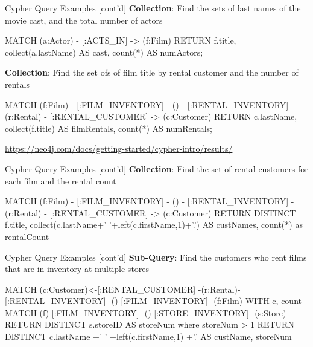 \documentclass[ignorenonframetext,xcolor=x11names]{beamer}
\begin{document}
\begin{frame}[fragile]{Cypher Query Examples \small [cont'd]}
\textbf{Collection}: Find the sets of last names of the movie cast, and the total number of actors
\footnotesize
\begin{cyphercode}
MATCH (a:Actor) - [:ACTS_IN] -> (f:Film) 
RETURN f.title, 
       collect(a.lastName) AS cast, 
       count(*) AS numActors;
\end{cyphercode}
\normalsize
\textbf{Collection}: Find the set ofs of film title by rental customer and the number of rentals
\footnotesize
\begin{cyphercode}
MATCH (f:Film) - [:FILM_INVENTORY] 
    - () - [:RENTAL_INVENTORY] 
    - (r:Rental) - [:RENTAL_CUSTOMER] 
    -> (c:Customer)
RETURN c.lastName, 
       collect(f.title) AS filmRentals, 
       count(*) AS numRentals;
\end{cyphercode}

\scriptsize
\url{https://neo4j.com/docs/getting-started/cypher-intro/results/}
\end{frame}


\begin{frame}[fragile]{Cypher Query Examples \small [cont'd]}
\textbf{Collection}: Find the set of rental customers for each film and the rental count
\footnotesize
\begin{cyphercode}
MATCH (f:Film) - [:FILM_INVENTORY] 
    - () - [:RENTAL_INVENTORY] 
    - (r:Rental) - [:RENTAL_CUSTOMER] 
    -> (c:Customer)
RETURN DISTINCT f.title, 
      collect(c.lastName+' '+left(c.firstName,1)+'.') 
          AS custNames, 
      count(*) as rentalCount
\end{cyphercode}
\end{frame}

\begin{frame}[fragile]{Cypher Query Examples \small [cont'd]}
\textbf{Sub-Query}: Find the customers who rent films that are in inventory at multiple stores
\footnotesize
\begin{cyphercode}
MATCH (c:Customer)<-[:RENTAL_CUSTOMER]
     -(r:Rental)-[:RENTAL_INVENTORY]
     -()-[:FILM_INVENTORY]
     -(f:Film) 
WITH c, count{ 
  MATCH (f)-[:FILM_INVENTORY]
       -()-[:STORE_INVENTORY]
       -(s:Store) 
  RETURN DISTINCT s.storeID
} AS storeNum
where storeNum > 1
RETURN DISTINCT 
  c.lastName
       +' '
       +left(c.firstName,1)
       +'.' AS custName, 
  storeNum
\end{cyphercode}
\end{frame}
\end{document}
